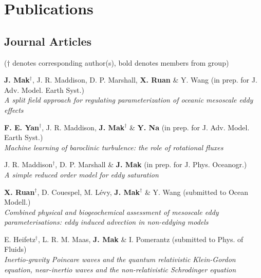 \documentclass[letterpaper]{article}
\renewenvironment{itemize}{
  \begin{list}{}{
    \setlength{\leftmargin}{1.5em}
  }
}{
  \end{list}
}
\begin{document}
\section*{Publications}
\subsection*{Journal Articles}

($\dagger$ denotes corresponding author(s), bold denotes members from group)

\begin{itemize}

\item[*] \textbf{J. Mak}$^{\dagger}$, J. R. Maddison, D. P. Marshall, \textbf{X. Ruan} \& Y. Wang (in prep. for J. Adv. Model. Earth Syst.)\\
\textit{A split field approach for regulating parameterization of oceanic mesoscale eddy effects}

\item[*] \textbf{F. E. Yan}$^{\dagger}$, J. R. Maddison, \textbf{J. Mak}$^{\dagger}$ \& \textbf{Y. Na} (in prep. for J. Adv. Model. Earth Syst.)\\
\textit{Machine learning of baroclinic turbulence: the role of rotational fluxes}


\item[*] J. R. Maddison$^{\dagger}$, D. P. Marshall \& \textbf{J. Mak} (in prep. for J. Phys. Oceanogr.)\\
\textit{A simple reduced order model for eddy saturation}

\item[*] \textbf{X. Ruan}$^{\dagger}$, D. Couespel, M. L\'evy, \textbf{J. Mak}$^{\dagger}$ \& Y. Wang (submitted to Ocean Modell.)\\
\textit{Combined physical and biogeochemical assessment of mesoscale eddy parameterisations: eddy induced advection in non-eddying models}

\item[*] E. Heifetz$^{\dagger}$, L. R. M. Maas, \textbf{J. Mak} \& I. Pomerantz (submitted to Phys. of Fluids)\\
\textit{Inertio-gravity Poincare waves and the quantum relativistic Klein-Gordon equation, near-inertio waves and the non-relativistic Schrodinger equation}


\end{itemize}
\end{document}

